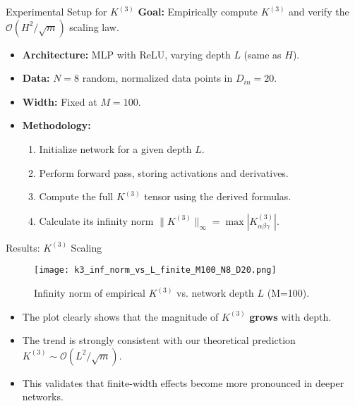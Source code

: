 \documentclass{beamer}
\newcommand{\Order}{\mathcal{O}}
\begin{document}
\begin{frame}{Experimental Setup for $K^{(3)}$}
\textbf{Goal:} Empirically compute $K^{(3)}$ and verify the $\Order(H^2/\sqrt{m})$ scaling law.
\begin{itemize}
    \item \textbf{Architecture:} MLP with ReLU, varying depth $L$ (same as $H$).
    \item \textbf{Data:} $N=8$ random, normalized data points in $D_{in}=20$.
    \item \textbf{Width:} Fixed at $M=100$.
    \item \textbf{Methodology:}
        \begin{enumerate}
            \item Initialize network for a given depth $L$.
            \item Perform forward pass, storing activations and derivatives.
            \item Compute the full $K^{(3)}$ tensor using the derived formulas.
            \item Calculate its infinity norm $\|K^{(3)}\|_\infty = \max |K^{(3)}_{\alpha\beta\gamma}|$.
        \end{enumerate}
\end{itemize}
\end{frame}

\begin{frame}{Results: $K^{(3)}$ Scaling}
\begin{figure}[h]
    \centering
    \texttt{[image: k3\_inf\_norm\_vs\_L\_finite\_M100\_N8\_D20.png]}
    \caption{Infinity norm of empirical $K^{(3)}$ vs. network depth $L$ (M=100).}
    \label{fig:k3_norm_vs_l}
\end{figure}
\begin{itemize}
    \item The plot clearly shows that the magnitude of $K^{(3)}$ \textbf{grows} with depth.
    \item The trend is strongly consistent with our theoretical prediction $K^{(3)} \sim \Order(L^2/\sqrt{m})$.
    \item This validates that finite-width effects become more pronounced in deeper networks.
\end{itemize}
\end{frame}
\end{document}
